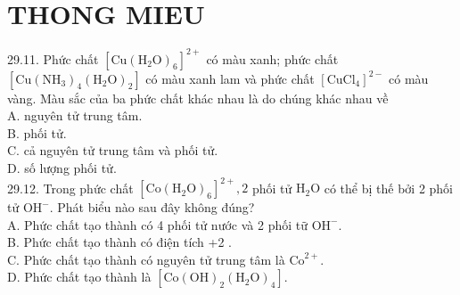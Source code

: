 \documentclass[10pt]{article}
\begin{document}
\section*{THONG MIEU}
29.11. Phức chất $\left[\mathrm{Cu}\left(\mathrm{H}_{2} \mathrm{O}\right)_{6}\right]^{2+}$ có màu xanh; phức chất $\left[\mathrm{Cu}\left(\mathrm{NH}_{3}\right)_{4}\left(\mathrm{H}_{2} \mathrm{O}\right)_{2}\right]$ có màu xanh lam và phức chất $\left[\mathrm{CuCl}_{4}\right]^{2-}$ có màu vàng. Màu sắc của ba phức chất khác nhau là do chúng khác nhau về\\
A. nguyên tử trung tâm.\\
B. phối tử.\\
C. cả nguyên tử trung tâm và phối tử.\\
D. số lượng phối tử.\\
29.12. Trong phức chất $\left[\mathrm{Co}\left(\mathrm{H}_{2} \mathrm{O}\right)_{6}\right]^{2+}, 2$ phối tử $\mathrm{H}_{2} \mathrm{O}$ có thể bị thế bởi 2 phối tử $\mathrm{OH}^{-}$. Phát biểu nào sau đây không đúng?\\
A. Phức chất tạo thành có 4 phối tử nước và 2 phối tữ $\mathrm{OH}^{-}$.\\
B. Phức chất tạo thành có điện tích +2 .\\
C. Phức chất tạo thành có nguyên tử trung tâm là $\mathrm{Co}^{2+}$.\\
D. Phức chất tạo thành là $\left[\mathrm{Co}(\mathrm{OH})_{2}\left(\mathrm{H}_{2} \mathrm{O}\right)_{4}\right]$.
\end{document}
